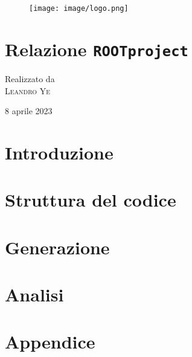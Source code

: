 \documentclass{article}
\begin{document}
\thispagestyle{empty} %

\begin{figure}[h]
    \centering
    \texttt{[image: image/logo.png]}
    \label{Logo}
\end{figure}

\vspace{2cm}

\section*{\centering \Huge \bf Relazione \texttt{ROOT\textunderscore project}}

\vspace{3cm}

\begin{center}
{\large Realizzato da} \\
\vspace{2cm}
{\Large \textsc{Leandro Ye}}    
\end{center}

\vspace{3cm}

\begin{center}
    {\large 8 aprile 2023}
\end{center}

\newpage

\section{Introduzione}



\section{Struttura del codice} 



\section{Generazione}



\section{Analisi}



\newpage
\section*{Appendice}
\appendix


\end{document}
